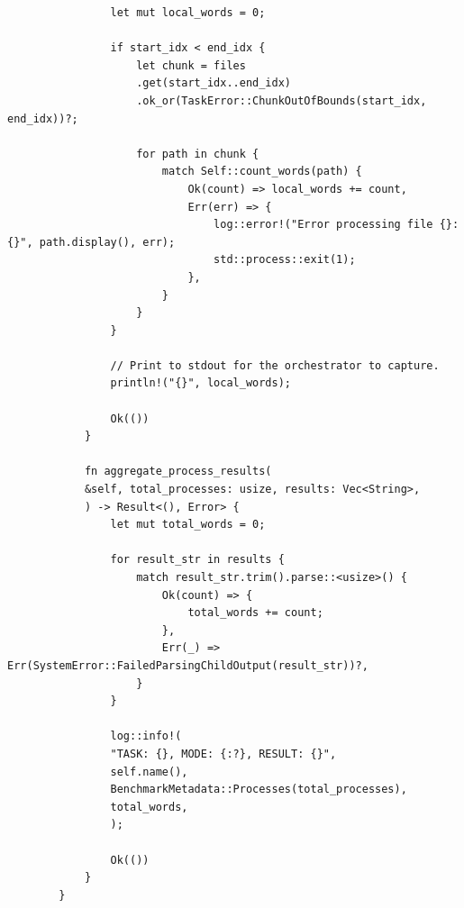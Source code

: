 \documentclass[14pt, a4paper]{extreport}
\begin{document}
\begin{verbatim}
				let mut local_words = 0;
				
				if start_idx < end_idx {
					let chunk = files
					.get(start_idx..end_idx)
					.ok_or(TaskError::ChunkOutOfBounds(start_idx, end_idx))?;
					
					for path in chunk {
						match Self::count_words(path) {
							Ok(count) => local_words += count,
							Err(err) => {
								log::error!("Error processing file {}: {}", path.display(), err);
								std::process::exit(1);
							},
						}
					}
				}
				
				// Print to stdout for the orchestrator to capture.
				println!("{}", local_words);
				
				Ok(())
			}
			
			fn aggregate_process_results(
			&self, total_processes: usize, results: Vec<String>,
			) -> Result<(), Error> {
				let mut total_words = 0;
				
				for result_str in results {
					match result_str.trim().parse::<usize>() {
						Ok(count) => {
							total_words += count;
						},
						Err(_) => Err(SystemError::FailedParsingChildOutput(result_str))?,
					}
				}
				
				log::info!(
				"TASK: {}, MODE: {:?}, RESULT: {}",
				self.name(),
				BenchmarkMetadata::Processes(total_processes),
				total_words,
				);
				
				Ok(())
			}
		}
	\end{verbatim}
\end{document}
